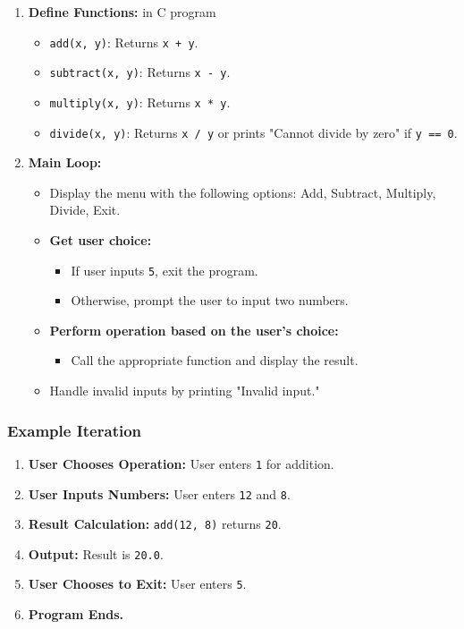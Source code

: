 \documentclass{article}
\begin{document}
\begin{enumerate}
    \item \textbf{Define Functions:} in C program
    \begin{itemize}
        \item \texttt{add(x, y)}: Returns \texttt{x + y}.
        \item \texttt{subtract(x, y)}: Returns \texttt{x - y}.
        \item \texttt{multiply(x, y)}: Returns \texttt{x * y}.
        \item \texttt{divide(x, y)}: Returns \texttt{x / y} or prints "Cannot divide by zero" if \texttt{y == 0}.
    \end{itemize}
    
    \item \textbf{Main Loop:}
    \begin{itemize}
        \item Display the menu with the following options: Add, Subtract, Multiply, Divide, Exit.
        \item \textbf{Get user choice:}
        \begin{itemize}
            \item If user inputs \texttt{5}, exit the program.
            \item Otherwise, prompt the user to input two numbers.
        \end{itemize}
        \item \textbf{Perform operation based on the user's choice:}
        \begin{itemize}
            \item Call the appropriate function and display the result.
        \end{itemize}
        \item Handle invalid inputs by printing "Invalid input."
    \end{itemize}
\end{enumerate}

\subsubsection*{Example Iteration}

\begin{enumerate}
    \item \textbf{User Chooses Operation:} User enters \texttt{1} for addition.
    \item \textbf{User Inputs Numbers:} User enters \texttt{12} and \texttt{8}.
    \item \textbf{Result Calculation:} \texttt{add(12, 8)} returns \texttt{20}.
    \item \textbf{Output:} Result is \texttt{20.0}.
    \item \textbf{User Chooses to Exit:} User enters \texttt{5}.
    \item \textbf{Program Ends.}
\end{enumerate}
\end{document}
